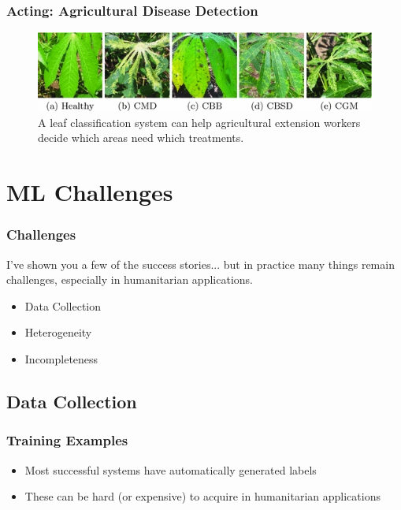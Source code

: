 \documentclass[10pt,mathserif]{beamer}
\begin{document}
\begin{frame}
  \frametitle{Acting: Agricultural Disease Detection}
  \begin{figure}[ht]
    \centering
    \includegraphics[options]{figures/cassava}
    \caption{A leaf classification system can help agricultural extension
      workers decide which areas need which treatments. \label{fig:cassava} }
  \end{figure}

\end{frame}

\section{ML Challenges}
\label{sec:label}

\begin{frame}
  \frametitle{Challenges}

  I've shown you a few of the success stories... but in practice many things
  remain challenges, especially in humanitarian applications.

  \begin{itemize}
  \item Data Collection
  \item Heterogeneity
  \item Incompleteness
  \end{itemize} 
\end{frame}

\subsection{Data Collection}
\label{subsec:label}

\begin{frame}
  \frametitle{Training Examples}
  \begin{itemize}
  \item Most successful systems have automatically generated labels
  \item These can be hard (or expensive) to acquire in humanitarian applications
  \end{itemize} 
\end{frame}
\end{document}
